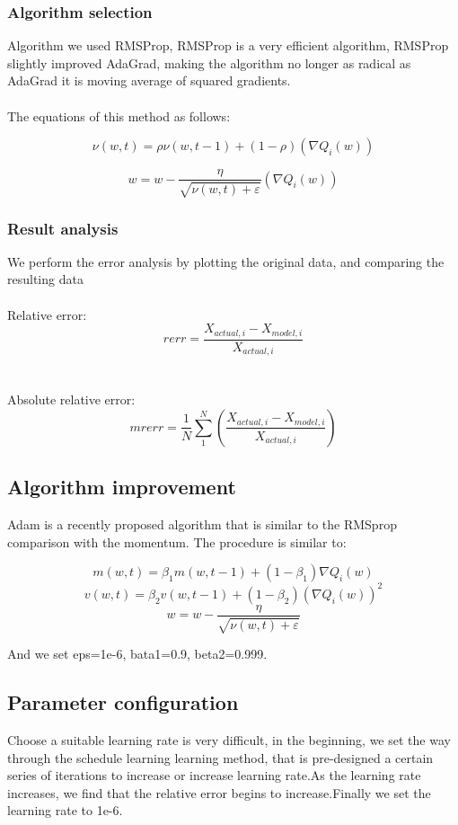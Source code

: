 \documentclass[conference,compsoc]{report}
\begin{document}
\subsubsection{Algorithm selection}
Algorithm we used RMSProp, RMSProp is a very efficient algorithm, RMSProp slightly improved AdaGrad, making the algorithm no longer as radical as AdaGrad it is moving average of squared gradients.
\\
\\
The equations of this method as follows:

$$ \nu\left (w, t \right ) = \rho \nu\left ( w, t - 1 \right ) + \left ( 1 - \rho \right )\left ( 
\nabla{Q}_{i}(w) \right )$$

$$ w  = w - \frac{\eta }{\sqrt{\nu (w, t) + \varepsilon }} \left ( \nabla{Q}_{i}(w) \right )$$

\subsubsection{Result analysis}
We perform the error analysis by plotting the original data, and comparing the resulting data
\\
\\
Relative error:
$$ rerr = \frac{{X}_{actual, i} - {X}_{model, i}}{{X}_{actual, i}} $$
\\
\\
Absolute relative error:
$$ mrerr = \frac{1}{N} \sum_{1}^{N}\left ( \frac{{X}_{actual, i} - {X}_{model, i}}{{X}_{actual, i}} \right ) $$


\subsection{Algorithm improvement}
Adam is a recently proposed algorithm that is similar to the RMSprop comparison with the momentum. The procedure is similar to:


$$m(w,t) = {\beta}_{1} m(w, t - 1) + (1 - {\beta}_{1})\nabla{Q}_{i}(w)$$
$$v(w,t) = {\beta}_{2} v(w, t - 1) + (1 - {\beta}_{2})(\nabla{Q}_{i}(w))^{2}$$
$$w  = w - \frac{\eta }{\sqrt{\nu (w, t) + \varepsilon }}$$

And we set eps=1e-6, bata1=0.9, beta2=0.999.


\subsection{Parameter configuration}
Choose a suitable learning rate is very difficult, in the beginning, we set the way through the schedule learning learning method, that is pre-designed a certain series of iterations to increase or increase learning rate.As the learning rate increases, we find that the relative error begins to increase.Finally we set the learning rate to 1e-6.
\end{document}
